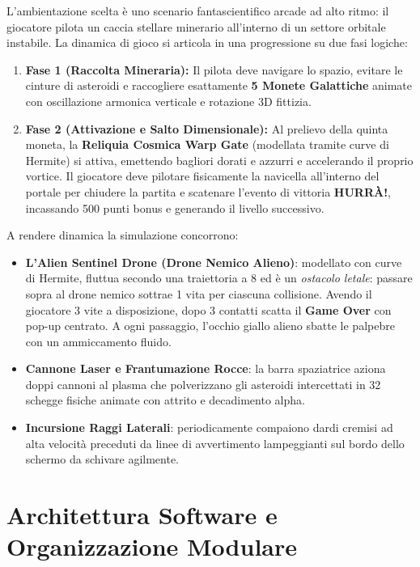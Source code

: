 \documentclass[11pt,a4paper]{article}
\begin{document}
L'ambientazione scelta è uno scenario fantascientifico arcade ad alto ritmo: il giocatore pilota un caccia stellare minerario all'interno di un settore orbitale instabile. La dinamica di gioco si articola in una progressione su due fasi logiche:
\begin{enumerate}
    \item \textbf{Fase 1 (Raccolta Mineraria):} Il pilota deve navigare lo spazio, evitare le cinture di asteroidi e raccogliere esattamente \textbf{5 Monete Galattiche} animate con oscillazione armonica verticale e rotazione 3D fittizia.
    \item \textbf{Fase 2 (Attivazione e Salto Dimensionale):} Al prelievo della quinta moneta, la \textbf{Reliquia Cosmica Warp Gate} (modellata tramite curve di Hermite) si attiva, emettendo bagliori dorati e azzurri e accelerando il proprio vortice. Il giocatore deve pilotare fisicamente la navicella all'interno del portale per chiudere la partita e scatenare l'evento di vittoria \textbf{HURR\`A!}, incassando 500 punti bonus e generando il livello successivo.
\end{enumerate}

\noindent A rendere dinamica la simulazione concorrono:
\begin{itemize}
    \item \textbf{L'Alien Sentinel Drone (Drone Nemico Alieno)}: modellato con curve di Hermite, fluttua secondo una traiettoria a 8 ed è un \textit{ostacolo letale}: passare sopra al drone nemico sottrae 1 vita per ciascuna collisione. Avendo il giocatore 3 vite a disposizione, dopo 3 contatti scatta il \textbf{Game Over} con pop-up centrato. A ogni passaggio, l'occhio giallo alieno sbatte le palpebre con un ammiccamento fluido.
    \item \textbf{Cannone Laser e Frantumazione Rocce}: la barra spaziatrice aziona doppi cannoni al plasma che polverizzano gli asteroidi intercettati in 32 schegge fisiche animate con attrito e decadimento alpha.
    \item \textbf{Incursione Raggi Laterali}: periodicamente compaiono dardi cremisi ad alta velocità preceduti da linee di avvertimento lampeggianti sul bordo dello schermo da schivare agilmente.
\end{itemize}

\section{Architettura Software e Organizzazione Modulare}
\end{document}
